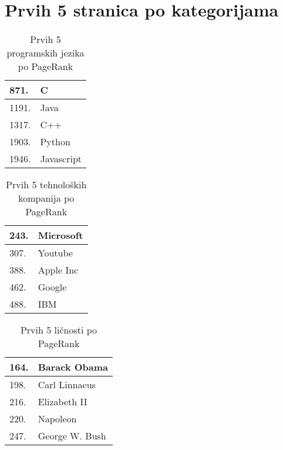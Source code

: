 \documentclass[12pt, journal, compsoc]{IEEEtran}
\begin{document}
\section*{Prvih 5 stranica po kategorijama}

\begin{table}[]
\large
\centering
\begin{tabular}{|l|l|}
\hline
871.                 & C                            \\ \hline
1191.                 & Java                         \\ \hline
1317.                 & C++                \\ \hline
1903.                 & Python                     \\ \hline
1946.                 & Javascript \\ \hline
\end{tabular}
\caption{Prvih 5 programskih jezika po PageRank}
\label{tabelaprogramskijezici5}
\end{table}

\begin{table}[]
\large
\centering
\begin{tabular}{|l|l|}
\hline
243.                 & Microsoft                            \\ \hline
307.                 & Youtube                         \\ \hline
388.                 & Apple Inc                \\ \hline
462.                 & Google                     \\ \hline
488.                 & IBM \\ \hline
\end{tabular}
\caption{Prvih 5 tehnoloških kompanija po PageRank}
\label{tabelatehnoloskih5}
\end{table}

\begin{table}[]
\large
\centering
\begin{tabular}{|l|l|}
\hline
164.                 & Barack Obama                            \\ \hline
198.                 & Carl Linnaeus \\ \hline
216.                 & Elizabeth II                \\ \hline
220.                 & Napoleon                     \\ \hline
247.                 & George W. Bush \\ \hline
\end{tabular}
\caption{Prvih 5 ličnosti po PageRank}
\label{tabelalicnosti5}
\end{table}
\end{document}

